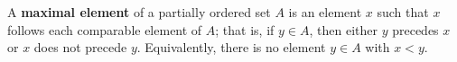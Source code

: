 A \textbf{maximal element} of a partially ordered set $A$ is an element $x$ such that $x$ follows each comparable element of $A$; that is, if $y \in A$, then either $y$ precedes $x$ or $x$ does not precede $y$. Equivalently, there is no element $y \in A$ with $x < y$.
